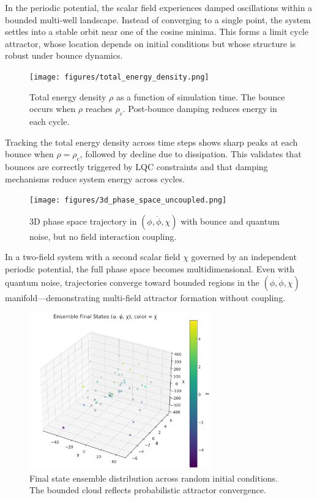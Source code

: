 \documentclass[12pt]{article}
\begin{document}
In the periodic potential, the scalar field experiences damped oscillations within a bounded multi-well landscape. Instead of converging to a single point, the system settles into a stable orbit near one of the cosine minima. This forms a limit cycle attractor, whose location depends on initial conditions but whose structure is robust under bounce dynamics.

\begin{figure}[h]
  \centering
  \texttt{[image: figures/total\_energy\_density.png]}
  \caption{Total energy density $\rho$ as a function of simulation time. The bounce occurs when $\rho$ reaches $\rho_c$. Post-bounce damping reduces energy in each cycle.}
\end{figure}

Tracking the total energy density across time steps shows sharp peaks at each bounce when $\rho = \rho_c$, followed by decline due to dissipation. This validates that bounces are correctly triggered by LQC constraints and that damping mechanisms reduce system energy across cycles.

\begin{figure}[h]
  \centering
  \texttt{[image: figures/3d\_phase\_space\_uncoupled.png]}
  \caption{3D phase space trajectory in $(\phi, \dot{\phi}, \chi)$ with bounce and quantum noise, but no field interaction coupling.}
\end{figure}

In a two-field system with a second scalar field $\chi$ governed by an independent periodic potential, the full phase space becomes multidimensional. Even with quantum noise, trajectories converge toward bounded regions in the $(\phi, \dot{\phi}, \chi)$ manifold—demonstrating multi-field attractor formation without coupling.

\begin{figure}[h]
  \centering
  \includegraphics[width=0.7\textwidth]{figures/ensemble_attractor_cloud.png}
  \caption{Final state ensemble distribution across random initial conditions. The bounded cloud reflects probabilistic attractor convergence.}
\end{figure}
\end{document}
